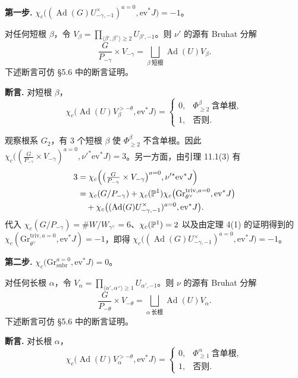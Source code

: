 \medskip\noindent\textbf{第一步.} $\chi_c\bigl((\operatorname{Ad}(G)U^\times_{-\gamma,-1})^{a=0},\mathrm{ev}^*J\bigr)=-1$。

对任何短根 $\beta$，令 $V_\beta=\prod_{\langle\beta',\beta^\vee\rangle\ge2}U_{\beta',-1}$。则 $\nu'$ 的源有 Bruhat 分解
\[
\frac{G}{P_{-\gamma}}\times V_{-\gamma}=\bigsqcup_{\beta\ \text{短根}}\operatorname{Ad}(U)V_\beta.
\]
下述断言可仿 §5.6 中的断言证明。

\medskip\noindent\textbf{断言.} 对短根 $\beta$，
\[
\chi_c\bigl(\operatorname{Ad}(U)V^{>-\theta}_\beta,\mathrm{ev}^*J\bigr)=
\begin{cases}
0, & \Phi^\beta_{\ge2}\ \text{含单根},\\
1, & \text{否则}.
\end{cases}
\]

观察根系 $G_2$，有 $3$ 个短根 $\beta$ 使 $\Phi^\beta_{\ge2}$ 不含单根。因此 $\chi_c\bigl((\frac{G}{P_{-\gamma}}\times V_{-\gamma})^{a=0},\nu'^*\mathrm{ev}^*J\bigr)=3$。另一方面，由引理 11.1(3) 有
\[
\begin{aligned}
3&=\chi_c\Bigl(\bigl(\tfrac{G}{P_{-\gamma}}\times V_{-\gamma}\bigr)^{a=0},\nu'^*\mathrm{ev}^*J\Bigr)\\
&=\chi_c(G/P_{-\gamma})+\chi_c(\mathbb{P}^1)\chi_c\bigl(\mathrm{Gr}^{\mathrm{triv},a=0}_{\theta^\vee},\mathrm{ev}^*J\bigr)\\
&\quad+\chi_c\bigl((\operatorname{Ad}(G)U^\times_{-\gamma,-1})^{a=0},\mathrm{ev}^*J\bigr).
\end{aligned}
\]
代入 $\chi_c(G/P_{-\gamma})=\#W/W_{\gamma^\vee}=6$、$\chi_c(\mathbb{P}^1)=2$ 以及由定理 4(1) 的证明得到的 $\chi_c(\mathrm{Gr}^{\mathrm{triv},a=0}_{\theta^\vee},\mathrm{ev}^*J)=-1$，即得 $\chi_c\bigl((\operatorname{Ad}(G)U^\times_{-\gamma,-1})^{a=0},\mathrm{ev}^*J\bigr)=-1$。

\medskip\noindent\textbf{第二步.} $\chi_c\bigl(\mathrm{Gr}^{a=0}_{\mathrm{subr}},\mathrm{ev}^*J\bigr)=0$。

对任何长根 $\alpha$，令 $V_\alpha=\prod_{\langle\alpha',\alpha^\vee\rangle\ge1}U_{\alpha',-1}$。则 $\nu$ 的源有 Bruhat 分解
\[
\frac{G}{P_{-\theta}}\times V_{-\theta}=\bigsqcup_{\alpha\ \text{长根}}\operatorname{Ad}(U)V_\alpha.
\]
下述断言可仿 §5.6 中的断言证明。

\medskip\noindent\textbf{断言.} 对长根 $\alpha$，
\[
\chi_c\bigl(\operatorname{Ad}(U)V^{>-\theta}_\alpha,\mathrm{ev}^*J\bigr)=
\begin{cases}
0, & \Phi^\alpha_{\ge1}\ \text{含单根},\\
1, & \text{否则}.
\end{cases}
\]

